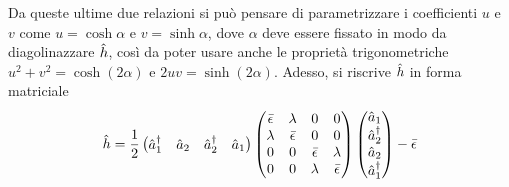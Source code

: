 Da queste ultime due relazioni si può pensare di parametrizzare i coefficienti $u$ e $v$ come $u = \cosh{\alpha}$ e $v = \sinh{\alpha}$, dove $\alpha$ deve essere fissato in modo da diagolinazzare $\hat{h}$, così da poter usare anche le proprietà trigonometriche $u^2 + v^2 = \cosh{(2\alpha)}$ e $2uv = \sinh{(2\alpha)}$. Adesso, si riscrive $\hat{h}$ in forma matriciale
\begin{equation}
\label{eq: hamiltoniana generica h in forma matriciale}
    \hat{h} = \frac{1}{2}
    \begin{pmatrix}
        \hat{a}^\dagger_1 & \hat{a}_2 & \hat{a}^\dagger_2 & \hat{a}_1
    \end{pmatrix}
    \begin{pmatrix}
        \bar{\epsilon} & \lambda & 0 & 0 \\
        \lambda & \bar{\epsilon} & 0 & 0 \\
        0 & 0 & \bar{\epsilon} & \lambda \\
        0 & 0 & \lambda & \bar{\epsilon}
    \end{pmatrix}
    \begin{pmatrix}
        \hat{a}_1 \\
        \hat{a}^\dagger_2 \\
        \hat{a}_2 \\
        \hat{a}^\dagger_1
    \end{pmatrix} - \bar{\epsilon}
\end{equation}
